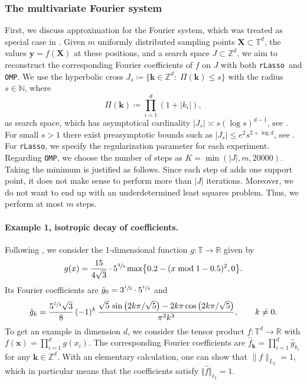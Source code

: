 \documentclass[11pt,reqno, a4paper]{article}
\numberwithin{equation}{section}
\newcommand{\Z}{\mathbb{Z}}
\newcommand{\R}{\mathbb{R}}
\newcommand{\rlasso}{\texttt{rLasso}}
\newcommand{\omp}{\texttt{OMP}}
\begin{document}
\subsubsection{The multivariate Fourier system}
First, we discuss approximation for the Fourier system, which was treated as special case in .
Given $m$ uniformly distributed sampling points $\mathbf X \subset \mathbb{T}^d$, the values $\mathbf y = f(\mathbf X)$ at these positions, and a search space $J \subset \mathbb Z^{d}$, we aim to reconstruct the corresponding Fourier coefficients of $f$ on $J$ with both \rlasso \ and \omp. We use the hyperbolic cross $J_{s} \coloneqq \{\mathbf{k}\in\mathbb{Z}^d\colon \; \Pi(\mathbf{k})\leq s\}$ with the radius $s\in \mathbb{N}$, where
\begin{equation}
    \Pi(\mathbf{k}) \coloneqq \prod\limits_{i=1}^d (1+\lvert k_i\rvert),
\end{equation}
as search space, which has asymptotical cardinality $\vert J_s \vert \asymp s(\log s)^{d-1}$, see \cite{KSU15}.
For small $s>1$ there exist preasymptotic bounds such as $\vert J_s \vert \leq e^2s^{2+\log d}$, see \cite[Proof of Thm.\ 4.9]{KSU15}.
For \rlasso, we specify the regularization parameter for each experiment.
Regarding \omp, we choose the number of steps as $K = \min(\vert J \vert, m, 20000)$.
Taking the minimum is justified as follows.
Since each step of  adds one support point, it does not make sense to perform more than $\vert J \vert$ iterations.
Moreover, we do not want to end up with an underdetermined least squares problem.
Thus, we perform at most $m$ steps.
\paragraph{Example 1, isotropic decay of coefficients.}
Following \cite[Sec.\ 10]{KamUllVol2021}, we consider the 1-dimensional function $g\colon \mathbb{T} \to \mathbb{R}$ given by
\begin{equation}\label{eq:Fourier_Approx_Basic_Func}
    g(x) = \frac{15}{4\sqrt{3}} \cdot 5^{\sfrac{3}{4}} \max\bigl\{0.2 - (x\bmod 1 -0.5)^2, 0\bigr\}.
\end{equation}
Its Fourier coefficients are $\hat{g}_0 = 3^{\sfrac{1}{2}}\cdot 5^{\sfrac{1}{4}}$ and
\begin{equation}\label{eq:Fourier_Approx_Basic_Coeffs}
    \hat{g}_{k} = \frac{5^{\sfrac{5}{4}}\sqrt{3}}{8} \, (-1)^{k} \, \frac{\sqrt{5} \, \sin\left(2k\pi/\sqrt{5}\right) - 2 k \pi \cos\left(2k\pi/\sqrt{5}\right)}{\pi^3 k^3}, \qquad k\neq 0.
\end{equation}
To get an example in dimension $d$, we consider the tensor product $f\colon \mathbb{T}^d\rightarrow\R$ with $f(\mathbf{x}) = \prod_{i=1}^{d} g(x_i)$.
The corresponding Fourier coefficients are $\hat{f}_{\mathbf{k}} = \prod_{i=1}^{d} \hat{g}_{k_i}$ for any $\mathbf{k} \in \Z^d$.
With an elementary calculation, one can show that $\lVert f \rVert_{L_2} = 1$, which in particular means that the coefficients satisfy $\Vert \hat f \Vert_{\ell_2} = 1$. 
\end{document}
